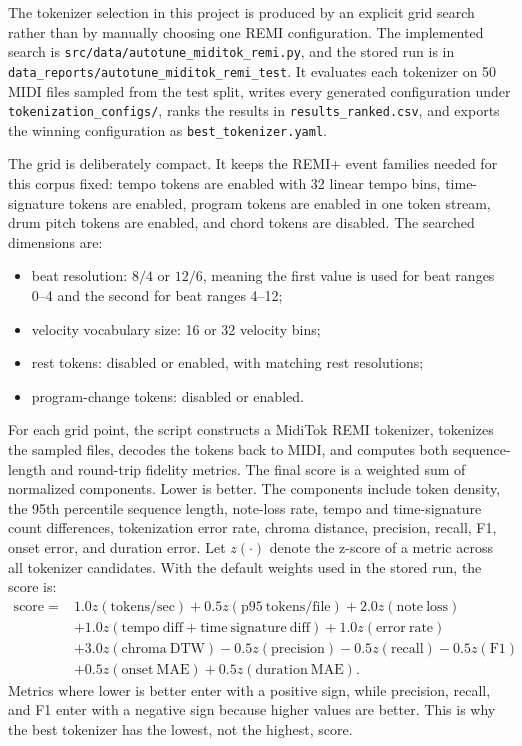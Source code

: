 The tokenizer selection in this project is produced by an explicit grid search rather than by manually choosing one REMI configuration. The implemented search is \verb|src/data/autotune_miditok_remi.py|, and the stored run is in \verb|data_reports/autotune_miditok_remi_test|. It evaluates each tokenizer on 50 MIDI files sampled from the test split, writes every generated configuration under \verb|tokenization_configs/|, ranks the results in \verb|results_ranked.csv|, and exports the winning configuration as \verb|best_tokenizer.yaml|.

The grid is deliberately compact. It keeps the REMI+ event families needed for this corpus fixed: tempo tokens are enabled with 32 linear tempo bins, time-signature tokens are enabled, program tokens are enabled in one token stream, drum pitch tokens are enabled, and chord tokens are disabled. The searched dimensions are:
\begin{itemize}
	\item beat resolution: \(8/4\) or \(12/6\), meaning the first value is used for beat ranges 0--4 and the second for beat ranges 4--12;
	\item velocity vocabulary size: 16 or 32 velocity bins;
	\item rest tokens: disabled or enabled, with matching rest resolutions;
	\item program-change tokens: disabled or enabled.
\end{itemize}

For each grid point, the script constructs a MidiTok REMI tokenizer, tokenizes the sampled files, decodes the tokens back to MIDI, and computes both sequence-length and round-trip fidelity metrics. The final score is a weighted sum of normalized components. Lower is better. The components include token density, the 95th percentile sequence length, note-loss rate, tempo and time-signature count differences, tokenization error rate, chroma distance, precision, recall, F1, onset error, and duration error. Let \(z(\cdot)\) denote the z-score of a metric across all tokenizer candidates. With the default weights used in the stored run, the score is:
\[
	\begin{array}{rl}
		\mathrm{score} = & 1.0z(\mathrm{tokens/sec}) + 0.5z(\mathrm{p95\ tokens/file}) + 2.0z(\mathrm{note\ loss})             \\
		                 & + 1.0z(\mathrm{tempo\ diff} + \mathrm{time\ signature\ diff}) + 1.0z(\mathrm{error\ rate})          \\
		                 & + 3.0z(\mathrm{chroma\ DTW}) - 0.5z(\mathrm{precision}) - 0.5z(\mathrm{recall}) - 0.5z(\mathrm{F1}) \\
		                 & + 0.5z(\mathrm{onset\ MAE}) + 0.5z(\mathrm{duration\ MAE}) .
	\end{array}
\]
Metrics where lower is better enter with a positive sign, while precision, recall, and F1 enter with a negative sign because higher values are better. This is why the best tokenizer has the lowest, not the highest, score.

